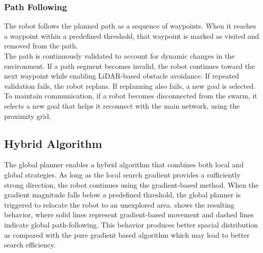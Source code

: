 \subsubsection{Path Following}
\label{sec:path_following}
The robot follows the planned path as a sequence of waypoints. When it reaches a waypoint within a predefined threshold, that waypoint is marked as visited and removed from the path. \\

The path is continuously validated to account for dynamic changes in the environment. If a path segment becomes invalid, the robot continues toward the next waypoint while enabling LiDAR-based obstacle avoidance. If repeated validation fails, the robot replans. If replanning also fails, a new goal is selected. \\

To maintain communication, if a robot becomes disconnected from the swarm, it selects a new goal that helps it reconnect with the main network, using the proximity grid.

\subsection{Hybrid Algorithm}
The global planner enables a hybrid algorithm that combines both local and global strategies. As long as the local search gradient provides a sufficiently strong direction, the robot continues using the gradient-based method. When the gradient magnitude falls below a predefined threshold, the global planner is triggered to relocate the robot to an unexplored area.  shows the resulting behavior, where solid lines represent gradient-based movement and dashed lines indicate global path-following. This behavior produces better spacial distribution as compared with the pure gradient based algorithm which may lead to better search efficiency.

